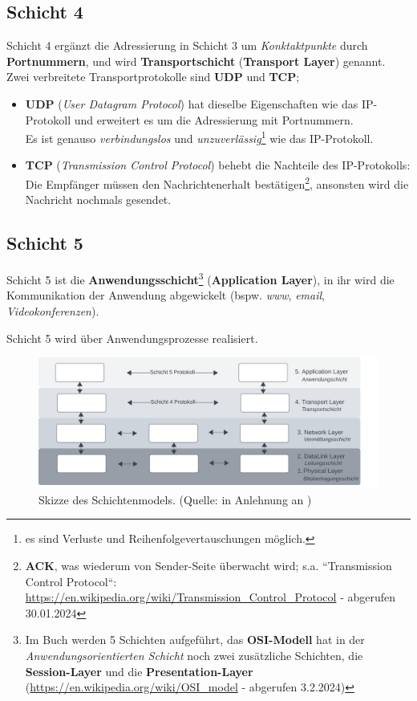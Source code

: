 \subsection*{Schicht 4}
Schicht 4 ergänzt die Adressierung in Schicht 3 um \textit{Konktaktpunkte} durch \textbf{Portnummern}, und wird \textbf{Transportschicht} (\textbf{Transport Layer}) genannt.\\

\noindent
Zwei verbreitete Transportprotokolle sind \textbf{UDP} und \textbf{TCP};

\begin{itemize}
    \item \textbf{UDP} (\textit{User Datagram Protocol}) hat dieselbe Eigenschaften wie das IP-Protokoll und erweitert es um die Adressierung mit Portnummern.\\
    Es ist genauso   \textit{verbindungslos} und \textit{unzuverlässig}\footnote{
    es sind Verluste und Reihenfolgevertauschungen möglich.
    } wie das IP-Protokoll.
    \item \textbf{TCP} (\textit{Transmission Control Protocol}) behebt die Nachteile des IP-Protokolls: Die Empfänger müssen den Nachrichtenerhalt bestätigen\footnote{ \textbf{ACK},
    was wiederum von Sender-Seite überwacht wird; s.a. ``Transmission Control Protocol``: \url{https://en.wikipedia.org/wiki/Transmission_Control_Protocol} - abgerufen 30.01.2024
    }, ansonsten wird die Nachricht nochmals gesendet.
\end{itemize}


\subsection*{Schicht 5}
Schicht 5 ist die \textbf{Anwendungsschicht}\footnote{
    Im Buch werden 5 Schichten aufgeführt, das \textbf{OSI-Modell} hat in der \textit{Anwendungsorientierten Schicht} noch zwei zusätzliche Schichten, die \textbf{Session-Layer} und die \textbf{Presentation-Layer} (\url{https://en.wikipedia.org/wiki/OSI_model} - abgerufen 3.2.2024)
} (\textbf{Application Layer}), in ihr wird die Kommunikation der Anwendung abgewickelt (bspw. \textit{www}, \textit{email}, \textit{Videokonferenzen}).


\begin{tcolorbox}
    Schicht 5 wird über Anwendungsprozesse realisiert.
\end{tcolorbox}


\begin{figure}
    \centering
    \includegraphics[width=16cm]{chapters/fopt5/img/layers}
    \caption{Skizze des Schichtenmodels. (Quelle: in Anlehnung an \cite[257, Bild 5.2]{Oec22})}
    \label{fig:layers}
\end{figure}


